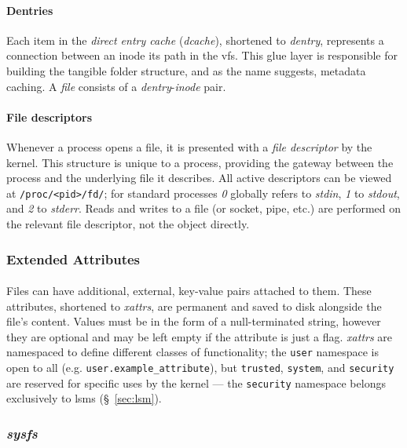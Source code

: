 \paragraph{Dentries} Each item in the \textit{direct entry cache} (\textit{dcache}), shortened to \textit{dentry}, represents a connection between an inode its path in the \acrshort{vfs}. This glue layer is responsible for building the tangible folder structure, and as the name suggests, metadata caching. A \textit{file} consists of a \textit{dentry}-\textit{inode} pair.

\paragraph{File descriptors} Whenever a process opens a file, it is presented with a \textit{file descriptor} by the kernel. This structure is unique to a process, providing the gateway between the process and the underlying file it describes. All active descriptors can be viewed at \texttt{/proc/<pid>/fd/}; for standard processes \textit{0} globally refers to \textit{stdin}, \textit{1} to \textit{stdout}, and \textit{2} to \textit{stderr}. Reads and writes to a file (or socket, pipe, etc.) are performed on the relevant file descriptor, not the object directly.

\subsubsection{Extended Attributes} 

\paragraph{} Files can have additional, external, key-value pairs attached to them. These attributes, shortened to \textit{\acrshort{xattr}s}, are permanent and saved to disk alongside the file's content. Values must be in the form of a null-terminated string, however they are optional and may be left empty if the attribute is just a flag. \textit{\acrshort{xattr}s} are namespaced to define different classes of functionality; the \texttt{user} namespace is open to all (e.g. \texttt{user.example\_attribute}), but \texttt{trusted}, \texttt{system}, and \texttt{security} are reserved for specific uses by the kernel --- the \texttt{security} namespace belongs exclusively to \acrshort{lsm}s (§~\ref{sec:lsm}).

\subsubsection{\textit{sysfs}}
